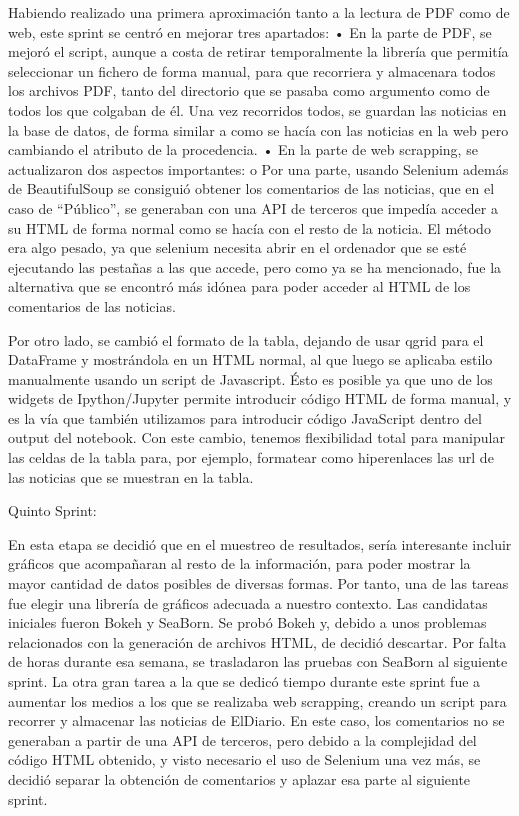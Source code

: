 Habiendo realizado una primera aproximación tanto a la lectura de PDF como de web, este sprint se centró en mejorar tres apartados:
•	En la parte de PDF, se mejoró el script, aunque a costa de retirar temporalmente la librería que permitía seleccionar un fichero de forma manual, para que recorriera y almacenara todos los archivos PDF, tanto del directorio que se pasaba como argumento como de todos los que colgaban de él. Una vez recorridos todos, se guardan las noticias en la base de datos, de forma similar a como se hacía con las noticias en la web pero cambiando el atributo de la procedencia.
•	En la parte de web scrapping, se actualizaron dos aspectos importantes:
o	Por una parte, usando Selenium además de BeautifulSoup se consiguió obtener los comentarios de las noticias, que en el caso de “Público”, se generaban con una API de terceros que impedía acceder a su HTML de forma normal como se hacía con el resto de la noticia. El método era algo pesado, ya que selenium necesita abrir en el ordenador que se esté ejecutando las pestañas a las que accede, pero como ya se ha mencionado, fue la alternativa que se encontró más idónea para poder acceder al HTML de los comentarios de las noticias.

Por otro lado, se cambió el formato de la tabla, dejando de usar qgrid para el DataFrame y mostrándola en un HTML normal, al que luego se aplicaba estilo manualmente usando un script de Javascript. Ésto es posible ya que uno de los widgets de Ipython/Jupyter permite introducir código HTML de forma manual, y es la vía que también utilizamos para introducir código JavaScript dentro del output del notebook. Con este cambio, tenemos flexibilidad total para manipular las celdas de la tabla para, por ejemplo, formatear como hiperenlaces las url de las noticias que se muestran en la tabla.

Quinto Sprint:

En esta etapa se decidió que en el muestreo de resultados, sería interesante incluir gráficos que acompañaran al resto de la información, para poder mostrar la mayor cantidad de datos posibles de diversas formas. Por tanto, una de las tareas fue elegir una librería de gráficos adecuada a nuestro contexto. 
Las candidatas iniciales fueron Bokeh y SeaBorn. Se probó Bokeh y, debido a unos problemas relacionados con la generación de archivos HTML, de decidió descartar. Por falta de horas durante esa semana, se trasladaron las pruebas con SeaBorn al siguiente sprint.
La otra gran tarea a la que se dedicó tiempo durante este sprint fue a aumentar los medios a los que se realizaba web scrapping, creando un script para recorrer y almacenar las noticias de ElDiario. En este caso, los comentarios no se generaban a partir de una API de terceros, pero debido a la complejidad del código HTML obtenido, y visto necesario el uso de Selenium una vez más, se decidió separar la obtención de comentarios y aplazar esa parte al siguiente sprint.

